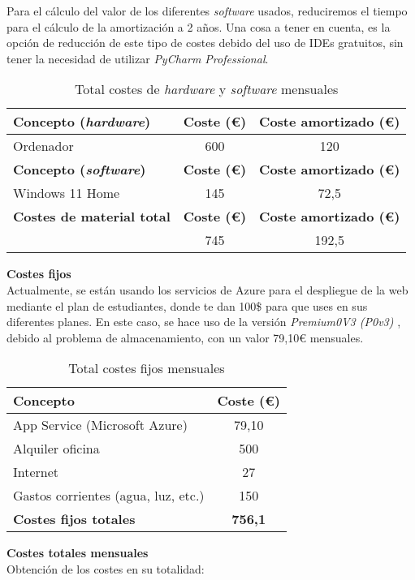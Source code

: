 Para el cálculo del valor de los diferentes \textit{software} usados, reduciremos el tiempo para el cálculo de la amortización a 2 años. Una cosa a tener en cuenta, es la opción de reducción de este tipo de costes debido del uso de IDEs gratuitos, sin tener la necesidad de utilizar \textit{PyCharm Professional}.

\begin{table}[H]
\centering
\begin{tabular}{lcc}
\toprule
\textbf{Concepto (\textit{hardware})} & \textbf{Coste (€)} & \textbf{Coste amortizado (€)}  \\
\midrule
Ordenador & 600 & 120 \\
\toprule
\textbf{Concepto (\textit{software})} & \textbf{Coste (€)} & \textbf{Coste amortizado (€)}  \\
\midrule
Windows 11 Home & 145 & 72,5 \\
\midrule
\textbf{Costes de material total} & \textbf{Coste (€)} & \textbf{Coste amortizado (€)} \\
 & 745 & 192,5 \\
\bottomrule
\end{tabular}
\caption{Total costes de \textit{hardware} y \textit{software} mensuales}
\end{table}

\textbf{Costes fijos} \\
Actualmente, se están usando los servicios de Azure para el despliegue de la web mediante el plan de estudiantes, donde te dan 100\$ para que uses en sus diferentes planes. En este caso, se hace uso de la versión \textit{Premium0V3 (P0v3)} \cite{Preciosd99:online}, debido al problema de almacenamiento, con un valor 79,10€ mensuales.

\begin{table}[H]
\centering
\begin{tabular}{lc}
\toprule
Concepto & Coste (€) \\
\midrule
App Service (Microsoft Azure) & 79,10 \\
Alquiler oficina & 500  \\
Internet & 27  \\
Gastos corrientes (agua, luz, etc.) & 150  \\
\midrule
\textbf{Costes fijos totales} & \textbf{756,1} \\
\bottomrule
\end{tabular}
\caption{Total costes fijos mensuales}
\end{table}

\textbf{Costes totales mensuales} \\
Obtención de los costes en su totalidad:

